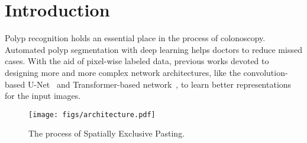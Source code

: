 \documentclass{article}
\begin{document}
\vspace{-0.2cm}
\section{Introduction}
\vspace{-0.2cm}
Polyp recognition holds an essential place in the process of colonoscopy. Automated polyp segmentation with deep learning helps doctors to reduce missed cases. With the aid of pixel-wise labeled data, previous works devoted to designing more and more complex network architectures, like the convolution-based U-Net~\cite{resunet, pranet,acsnet,msrf,dcrnet} and Transformer-based network~\cite{ssformer, FCBFormer,colonformer,transfuse}, to learn better representations for the input images. 

\begin{figure*}[t]
    \centerline{\texttt{[image: figs/architecture.pdf]}}
\caption{The process of Spatially Exclusive Pasting.}
\label{fig:furtherpaster}
\end{figure*}
\end{document}
